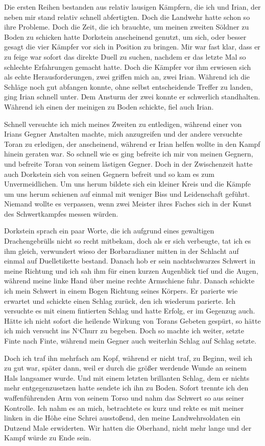 Die ersten Reihen bestanden aus relativ lausigen Kämpfern, die ich und Irian, der neben mir stand relativ schnell abfertigten. Doch die Landwehr hatte schon so ihre Probleme. Doch die Zeit, die ich brauchte, um meinen zweiten Söldner zu Boden zu schicken hatte Dorkstein anscheinend genutzt, um sich, oder besser gesagt die vier Kämpfer vor sich in Position zu bringen. Mir war fast klar, dass er zu feige war sofort das direkte Duell zu suchen, nachdem er das letzte Mal so schlechte Erfahrungen gemacht hatte. Doch die Kämpfer vor ihm erwiesen sich als echte Herausforderungen, zwei griffen mich an, zwei Irian. Während ich die Schläge noch gut abfangen konnte, ohne selbst entscheidende Treffer zu landen, ging Irian schnell unter. Dem Ansturm der zwei konnte er schwerlich standhalten. Während ich einen der meinigen zu Boden schickte, fiel auch Irian. 

Schnell versuchte ich mich meines Zweiten zu entledigen, während einer von Irians Gegner Anstalten machte, mich anzugreifen und der andere versuchte Toran zu erledigen, der anscheinend, während er Irian helfen wollte in den Kampf hinein geraten war. So schnell wie es ging befreite ich mir von meinen Gegnern, und befreite Toran von seinem lästigen Gegner. Doch in der Zwischenzeit hatte auch Dorkstein sich von seinen Gegnern befreit und so kam es zum Unvermeidlichen. Um uns herum bildete sich ein kleiner Kreis und die Kämpfe um uns herum schienen auf einmal mit weniger Biss und Leidenschaft geführt. Niemand wollte es verpassen, wenn zwei Meister ihres Faches sich in der Kunst des Schwertkampfes messen würden. 

Dorkstein sprach ein paar Worte, die ich aufgrund eines gewaltigen Drachengebrülls nicht so recht mitbekam, doch als er sich verbeugte, tat ich es ihm gleich, verwundert wieso der Borbaradianer mitten in der Schlacht auf einmal auf Duelletikette bestand. Danach hob er sein nachtschwarzes Schwert in meine Richtung und ich sah ihm für einen kurzen Augenblick tief und die Augen, während meine linke Hand über meine rechte Armschiene fuhr. Danach schickte ich mein Schwert in einem Bogen Richtung seines Körpers. Er parierte wie erwartet und schickte einen Schlag zurück, den ich wiederum parierte. Ich versuchte es mit einem fintierten Schlag und hatte Erfolg, er im Gegenzug auch. Hätte ich nicht sofort die heilende Wirkung von Torans Gebeten gespürt, so hätte ich mich versucht ins N`Churr zu begeben. Doch so machte ich weiter, setzte Finte nach Finte, während mein Gegner auch weiterhin Schlag auf Schlag setzte. 

Doch ich traf ihn mehrfach am Kopf, während er nicht traf, zu Beginn, weil ich zu gut war, später dann, weil er durch die größer werdende Wunde an seinem Hals langsamer wurde. Und mit einem letzten brillanten Schlag, dem er nichts mehr entgegenzusetzen hatte sendete ich ihn zu Boden. Sofort trennte ich den waffenführenden Arm von seinem Torso und nahm das Schwert so aus seiner Kontrolle. Ich nahm es an mich, betrachtete es kurz und rekte es mit meiner linken in die Höhe eine Schrei ausstoßend, den meine Landwehrsoldaten ein Dutzend Male erwiderten. Wir hatten die Oberhand, nicht mehr lange und der Kampf würde zu Ende sein.


